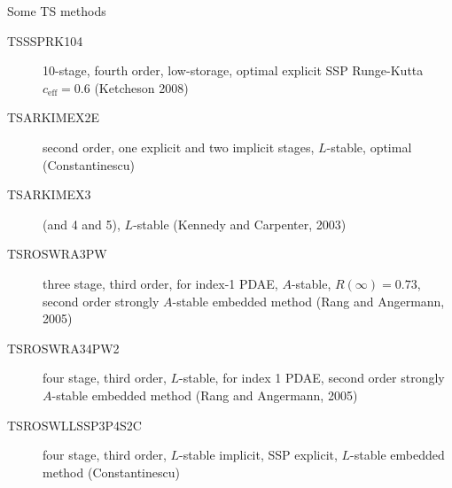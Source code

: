 \begin{frame}{Some TS methods}
  \begin{description}
  \item[TSSSPRK104] 10-stage, fourth order, low-storage, optimal explicit SSP Runge-Kutta $c_{\text{eff}} = 0.6$ (Ketcheson 2008)
  \item[TSARKIMEX2E] second order, one explicit and two implicit stages, $L$-stable, optimal (Constantinescu)
  \item[TSARKIMEX3] (and 4 and 5), $L$-stable (Kennedy and Carpenter, 2003)
  \item[TSROSWRA3PW] three stage, third order, for index-1 PDAE, $A$-stable, $R(\infty) = 0.73$, second order strongly $A$-stable embedded method (Rang and Angermann, 2005)
  \item[TSROSWRA34PW2] four stage, third order, $L$-stable, for index 1 PDAE, second order strongly $A$-stable embedded method (Rang and Angermann, 2005)
  \item[TSROSWLLSSP3P4S2C] four stage, third order, $L$-stable implicit, SSP explicit, $L$-stable embedded method (Constantinescu)
  \end{description}
\end{frame}

